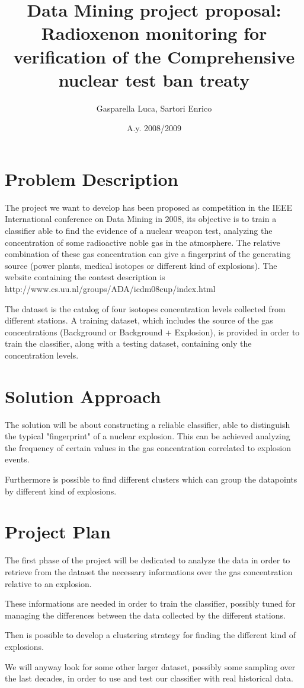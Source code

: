 \documentclass[12pt,a4paper]{article}
\title{Data Mining project proposal:\\
Radioxenon monitoring for verification of the Comprehensive nuclear test ban
treaty}
\author{Gasparella Luca, Sartori Enrico}
\date{A.y. 2008/2009}
\begin{document}
\maketitle
\section{Problem Description}
The project we want to develop has been proposed as competition in the
IEEE International conference on Data Mining in 2008, its objective is 
to train a classifier able to find the evidence of a nuclear weapon test,
analyzing the concentration of some radioactive noble gas in the atmosphere.
The relative combination of these gas concentration can give a fingerprint
of the generating source (power plants, medical isotopes or different kind
of explosions).
The website containing the contest description is 
http://www.cs.uu.nl/groups/ADA/icdm08cup/index.html

The dataset is the catalog of four isotopes concentration levels collected 
from different stations. A training dataset, which includes the source of
the gas concentrations (Background or Background + Explosion), is provided
in order to train the classifier, along with a testing dataset, containing 
only the concentration levels.

\section{Solution Approach}
The solution will be about constructing a reliable classifier, able to 
distinguish the typical "fingerprint" of a nuclear explosion. This can be
achieved analyzing the frequency of certain values in the gas concentration
correlated to explosion events.

Furthermore is possible to find different clusters which can group the 
datapoints by different kind of explosions.

\section{Project Plan}
The first phase of the project will be dedicated to analyze the data in 
order to retrieve from the dataset the necessary informations over the
gas concentration relative to an explosion.

These informations are needed in order to train the classifier, possibly
tuned for managing the differences between the data collected by the 
different stations.

Then is possible to develop a clustering strategy for finding the different
kind of explosions. 

We will anyway look for some other larger dataset, possibly some sampling 
over the last decades, in order to use and test our classifier with real 
historical data. 
\end{document}
